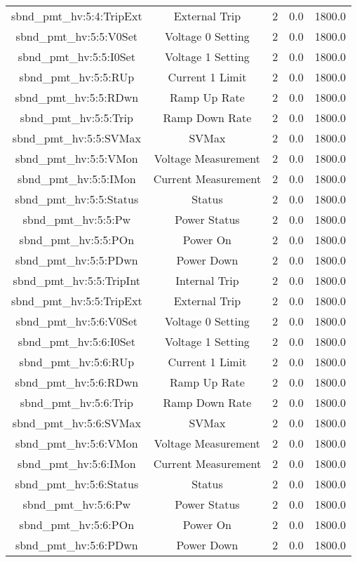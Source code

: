 \begin{table}[ptb]
\begin{tabular}{c | c c c c}
sbnd_pmt_hv:5:4:TripExt & External Trip & 2 & 0.0 & 1800.0\\ 
sbnd_pmt_hv:5:5:V0Set & Voltage 0 Setting & 2 & 0.0 & 1800.0\\ 
sbnd_pmt_hv:5:5:I0Set & Voltage 1 Setting & 2 & 0.0 & 1800.0\\ 
sbnd_pmt_hv:5:5:RUp & Current 1 Limit & 2 & 0.0 & 1800.0\\ 
sbnd_pmt_hv:5:5:RDwn & Ramp Up Rate & 2 & 0.0 & 1800.0\\ 
sbnd_pmt_hv:5:5:Trip & Ramp Down Rate & 2 & 0.0 & 1800.0\\ 
sbnd_pmt_hv:5:5:SVMax & SVMax & 2 & 0.0 & 1800.0\\ 
sbnd_pmt_hv:5:5:VMon & Voltage Measurement & 2 & 0.0 & 1800.0\\ 
sbnd_pmt_hv:5:5:IMon & Current Measurement & 2 & 0.0 & 1800.0\\ 
sbnd_pmt_hv:5:5:Status & Status & 2 & 0.0 & 1800.0\\ 
sbnd_pmt_hv:5:5:Pw & Power Status & 2 & 0.0 & 1800.0\\ 
sbnd_pmt_hv:5:5:POn & Power On & 2 & 0.0 & 1800.0\\ 
sbnd_pmt_hv:5:5:PDwn & Power Down & 2 & 0.0 & 1800.0\\ 
sbnd_pmt_hv:5:5:TripInt & Internal Trip & 2 & 0.0 & 1800.0\\ 
sbnd_pmt_hv:5:5:TripExt & External Trip & 2 & 0.0 & 1800.0\\ 
sbnd_pmt_hv:5:6:V0Set & Voltage 0 Setting & 2 & 0.0 & 1800.0\\ 
sbnd_pmt_hv:5:6:I0Set & Voltage 1 Setting & 2 & 0.0 & 1800.0\\ 
sbnd_pmt_hv:5:6:RUp & Current 1 Limit & 2 & 0.0 & 1800.0\\ 
sbnd_pmt_hv:5:6:RDwn & Ramp Up Rate & 2 & 0.0 & 1800.0\\ 
sbnd_pmt_hv:5:6:Trip & Ramp Down Rate & 2 & 0.0 & 1800.0\\ 
sbnd_pmt_hv:5:6:SVMax & SVMax & 2 & 0.0 & 1800.0\\ 
sbnd_pmt_hv:5:6:VMon & Voltage Measurement & 2 & 0.0 & 1800.0\\ 
sbnd_pmt_hv:5:6:IMon & Current Measurement & 2 & 0.0 & 1800.0\\ 
sbnd_pmt_hv:5:6:Status & Status & 2 & 0.0 & 1800.0\\ 
sbnd_pmt_hv:5:6:Pw & Power Status & 2 & 0.0 & 1800.0\\ 
sbnd_pmt_hv:5:6:POn & Power On & 2 & 0.0 & 1800.0\\ 
sbnd_pmt_hv:5:6:PDwn & Power Down & 2 & 0.0 & 1800.0\\ 

\end{tabular}
\end{table}
